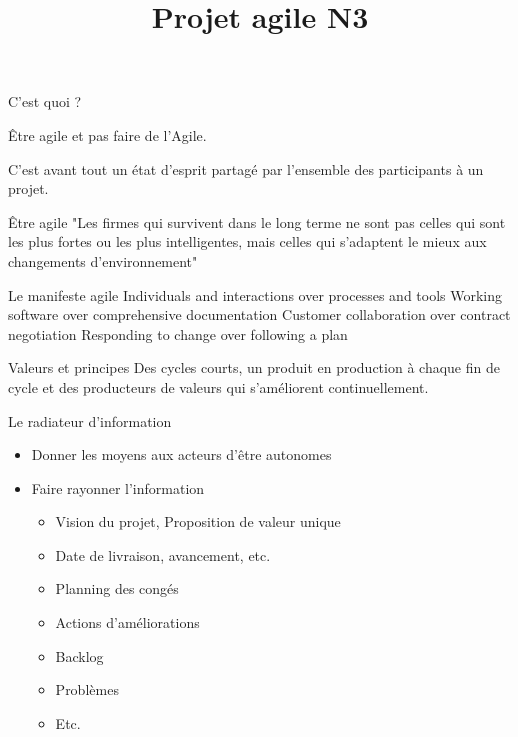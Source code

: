\documentclass{beamer}
\title{Projet agile N3}
\author{
}
\date{}
\begin{document}
\frame{\titlepage}


\begin{frame}{C'est quoi ?}
 
  {\Large \alert{Être agile} et pas faire de l'Agile.}

  \vspace{6mm}
  C'est avant tout un état d'esprit partagé par l'ensemble des participants à un projet.
\end{frame}

\begin{frame}{Être agile}
  "Les firmes qui survivent dans le long terme ne sont pas celles qui sont les plus fortes ou les plus intelligentes, mais celles qui s'adaptent le mieux aux changements d'environnement"


\end{frame}

\begin{frame}{Le manifeste agile}
  \large
  \alert{Individuals and interactions} over processes and tools\newline
  \alert{Working software} over comprehensive documentation\newline
  \alert{Customer collaboration} over contract negotiation\newline
  \alert{Responding to change} over following a plan
\end{frame}

\begin{frame}{Valeurs et principes}
  \Large Des cycles courts, un produit en production à chaque fin de cycle et des producteurs de valeurs qui s'améliorent continuellement.
\end{frame}

\begin{frame}{Le radiateur d'information}
  \begin{itemize}
    \item Donner les moyens aux acteurs d'être autonomes
    \item Faire rayonner l'information
    
    \begin{itemize}
      \item Vision du projet, Proposition de valeur unique
      \item Date de livraison, avancement, etc.
      \item Planning des congés
      \item Actions d'améliorations
      \item Backlog
      \item Problèmes
      \item Etc.
    \end{itemize}
  \end{itemize}
\end{frame}
\end{document}
